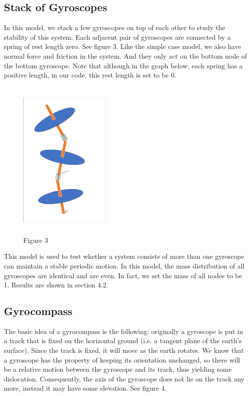 \documentclass[12pt]{article}
\renewcommand{\(}{\left (}
\renewcommand{\)}{\right )}
\begin{document}
\subsection{Stack of Gyroscopes}
\hspace{5mm} In this model, we stack a few gyroscopes on top of each other to study the stability of this system. Each adjacent pair of gyroscopes are connected by a spring of rest length zero. See figure 3. Like the simple case model, we also have normal force and friction in the system. And they only act on the bottom node of the bottom gyroscope. Note that although in the graph below, each spring has a positive length, in our code, this rest length is set to be 0.
\begin {figure}[ht]
	\centering
    \includegraphics[width=0.4\textwidth, height=8cm]{stack_model.png}
    \caption*{\small Figure 3}
\end {figure}

This model is used to test whether a system consists of more than one gyroscope can maintain a stable periodic motion. In this model, the mass distribution of all gyroscopes are identical and are even. In fact, we set the mass of all nodes to be 1. Results are shown in section 4.2.

\subsection{Gyrocompass}
\hspace{5mm} The basic idea of a gyrocompass is the following: originally a gyroscope is put in a track that is fixed on the horizontal ground (i.e. a tangent plane of the earth's surface). Since the track is fixed, it will move as the earth rotates. We know that a gyroscope has the property of keeping its orientation unchanged, so there will be a relative motion between the gyroscope and its track, thus yielding some dislocation. Consequently, the axis of the gyroscope does not lie on the track any more, instead it may have some elevation. See figure 4.
\end{document}
